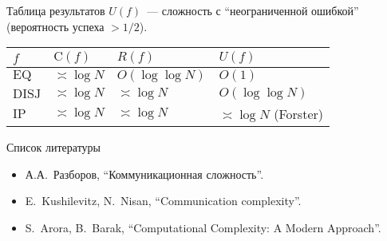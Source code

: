 \documentclass[handout]{beamer}
\renewcommand\C{\mathrm{C}}
\begin{document}
\begin{frame}{Таблица результатов}
    $U(f)$~--- сложность с ``неограниченной ошибкой'' (вероятность успеха
    $>1/2$).
    \vspace{5pt}

    \begin{tabular}{|l|l|l|l|}
        \hline
        $f$ & $\C(f)$ & $R(f)$ & $U(f)$ \\
        \hline
        $\mathrm{EQ}$ & $\asymp\log N$ & $O(\log\log N)$ & $O(1)$ \\
        $\mathrm{DISJ}$ & $\asymp\log N$ & $\asymp\log N$ & $O(\log\log N)$ \\
        $\mathrm{IP}$ & $\asymp\log N$ & $\asymp\log N$ & $\asymp\log N$ (Forster) \\
        \hline
    \end{tabular}
\end{frame}


\begin{frame}{Список литературы}
    \begin{itemize}
        \item А.А.~Разборов, ``Коммуникационная сложность''.
        \item E.~Kushilevitz, N.~Nisan, ``Communication complexity''.
        \item S.~Arora, B.~Barak, ``Computational Complexity: A Modern Approach''.
    \end{itemize}
\end{frame}
\end{document}
